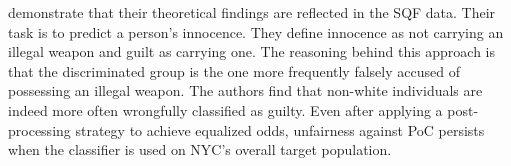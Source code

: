 \cite{kallus2018} demonstrate that their theoretical findings are reflected in the SQF data. Their task is to predict a person's innocence. They define innocence as not carrying an illegal weapon and guilt as carrying one. The reasoning behind this approach is that the discriminated group is the one more frequently falsely accused of possessing an illegal weapon. The authors find that non-white individuals are indeed more often wrongfully classified as guilty. Even after applying a post-processing strategy to achieve equalized odds, unfairness against PoC persists when the classifier is used on NYC’s overall target population.


